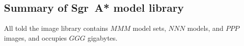 


\subsection{Summary of Sgr~A* model library}

All told the image library contains $MMM$ model sets, $NNN$ models, and $PPP$ images, and occupies $GGG$ gigabytes.


\pagebreak

